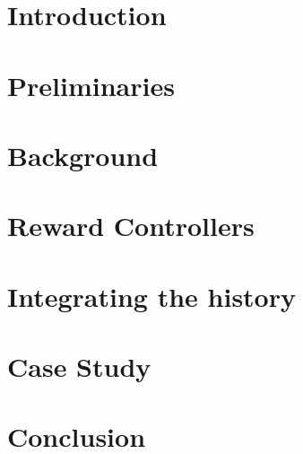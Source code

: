 \documentclass[12pt]{report}
\begin{document}
	\chapter{Introduction}
	
	
	\chapter{Preliminaries}
	
	
	\chapter{Background}
	
	
	\chapter{Reward Controllers}
	
	
	\chapter{Integrating the history}
	
	
	\chapter{Case Study}
		
	
	\chapter{Conclusion}
	
	
	
	
	

	\newpage
	
	
	
	
	
\end{document}
